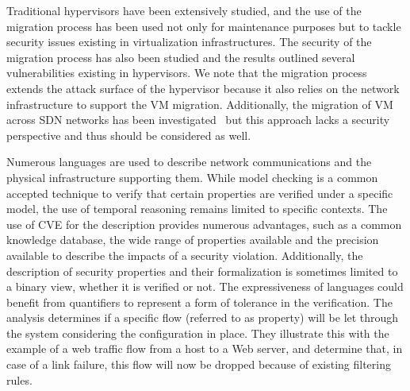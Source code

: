 Traditional hypervisors have been extensively studied, and the use of the migration process has been used not only for maintenance purposes but to tackle security issues existing in virtualization infrastructures.
The security of the migration process has also been studied and the results outlined several vulnerabilities existing in hypervisors.
We note that the migration process extends the attack surface of the hypervisor because it also relies on the network infrastructure to support the VM migration.
Additionally, the migration of VM across SDN networks has been investigated~\cite{Datacenters2014,Lin2013,Ibn-Khedher2015} but this approach lacks a security perspective and thus should be considered as well.

Numerous languages are used to describe network communications and the physical infrastructure supporting them. While model checking is a common accepted technique to verify that certain properties are verified under a specific model, the use of temporal reasoning remains limited to specific contexts.
The use of CVE for the description provides numerous advantages, such as a common knowledge database, the wide range of properties available and the precision available to describe the impacts of a security violation.
Additionally, the description of security properties and their formalization is sometimes limited to a binary view, whether it is verified or not. The expressiveness of languages could benefit from quantifiers to represent a form of tolerance in the verification.
The analysis determines if a specific flow (referred to as property) will be let through the system considering the configuration in place. They illustrate this with the example of a web traffic flow from a host to a Web server, and determine that, in case of a link failure, this flow will now be dropped because of existing filtering rules.

